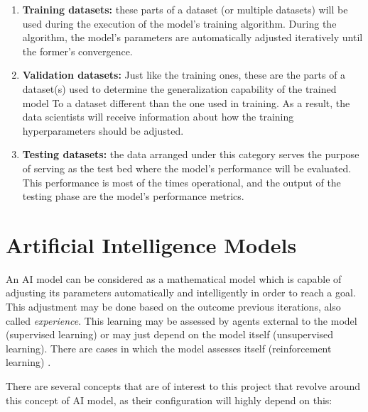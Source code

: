 \begin{enumerate}

    \item \textbf{Training datasets:} these parts of a dataset (or multiple datasets) will be used during the execution of the model's training algorithm. During the algorithm,
    the model's parameters are automatically adjusted iteratively until the former's convergence.

    \item \textbf{Validation datasets:} Just like the training ones, these are the parts of a dataset(s) used to determine the generalization capability of the trained model To
    a dataset different than the one used in training. As a result, the data scientists will receive information about how the training hyperparameters should be adjusted.

    \item \textbf{Testing datasets:} the data arranged under this category serves the purpose of serving as the test bed where the model's performance will be evaluated. This
    performance is most of the times operational, and the output of the testing phase are the model's performance metrics.

\end{enumerate}

\section{Artificial Intelligence Models}

An \acrlong{AI} model can be considered as a mathematical model which is capable of adjusting its parameters automatically and intelligently in order to reach a goal. This adjustment
may be done based on the outcome previous iterations, also called \emph{experience}. This learning may be assessed by agents external to the model (supervised learning) or may just depend
on the model itself (unsupervised learning). There are cases in which the model assesses itself (reinforcement learning) \cite{introml}.

There are several concepts that are of interest to this project that revolve around this concept of \acrshort{AI} model, as their configuration will highly depend on this:

